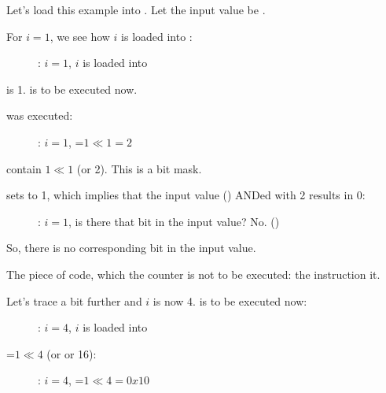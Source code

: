 ﻿\clearpage
\mysubparagraph{\olly}
\myindex{\olly}

Let's load this example into \olly. 
Let the input value be .

For $i=1$, we see how $i$ is loaded into \ECX: 

\begin{figure}[H]
\centering
{}
\caption{\olly: $i=1$, $i$ is loaded into \ECX}
\label{fig:shifts_olly1_1}
\end{figure}

\EDX is 1. \SHL is to be executed now.

\clearpage
\SHL was executed:

\begin{figure}[H]
\centering
{}
\caption{\olly: $i=1$, \EDX=$1 \ll 1=2$}
\label{fig:shifts_olly1_2}
\end{figure}

\EDX contain $1 \ll 1$ (or 2). This is a bit mask.

\clearpage
\AND sets \ZF to 1, which implies that the input value ()  ANDed with 2 results in 0:

\begin{figure}[H]
\centering
{}
\caption{\olly: $i=1$, 
is there that bit in the input value? No. ()}
\label{fig:shifts_olly1_3}
\end{figure}

So, there is no corresponding bit in the input value.

The piece of code, which  the counter is not to be executed: 
the \JZ instruction  it.

\clearpage
Let's trace a bit further and $i$ is now 4.
\SHL is to be executed now:

\begin{figure}[H]
\centering
{}
\caption{\olly: $i=4$, $i$ is loaded into \ECX}
\label{fig:shifts_olly4_1}
\end{figure}

\clearpage
\EDX=$1 \ll 4$ (or  or 16): 

\begin{figure}[H]
\centering
{}
\caption{\olly: $i=4$, \EDX=$1 \ll 4=0x10$}
\label{fig:shifts_olly4_2}
\end{figure}

